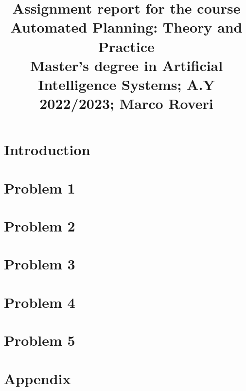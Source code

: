 \documentclass[conference]{IEEEtran}
\begin{document}
\title{Assignment report for the course\\ Automated Planning: Theory and Practice\\
{\footnotesize Master's degree in Artificial Intelligence Systems;
A.Y 2022/2023;
Marco Roveri}
}

\author{

\and
{}

}

\maketitle

\section{Introduction}

\section{Problem 1}

\section{Problem 2}

\section{Problem 3}

\section{Problem 4}

\section{Problem 5}

\pagebreak
\onecolumn

\section{Appendix}




\end{document}
